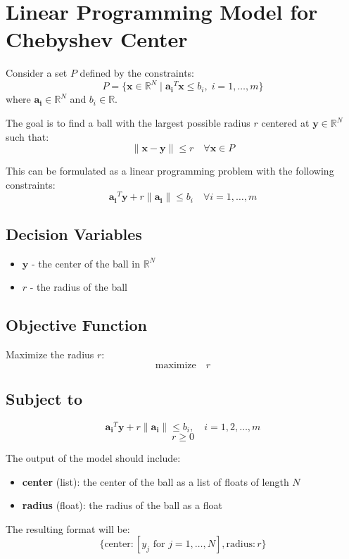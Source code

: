 \documentclass{article}
\begin{document}
\section*{Linear Programming Model for Chebyshev Center}

Consider a set \( P \) defined by the constraints:
\[
P = \{ \mathbf{x} \in \mathbb{R}^N \mid \mathbf{a_i}^T \mathbf{x} \leq b_i, \; i = 1, \ldots, m \}
\]
where \( \mathbf{a_i} \in \mathbb{R}^N \) and \( b_i \in \mathbb{R} \).

The goal is to find a ball with the largest possible radius \( r \) centered at \( \mathbf{y} \in \mathbb{R}^N \) such that:
\[
\|\mathbf{x} - \mathbf{y}\| \leq r \quad \forall \mathbf{x} \in P
\]

This can be formulated as a linear programming problem with the following constraints:
\[
\mathbf{a_i}^T \mathbf{y} + r \|\mathbf{a_i}\| \leq b_i \quad \forall i = 1, \ldots, m
\]

\subsection*{Decision Variables}
\begin{itemize}
    \item \( \mathbf{y} \) - the center of the ball in \( \mathbb{R}^N \)
    \item \( r \) - the radius of the ball
\end{itemize}

\subsection*{Objective Function}
Maximize the radius \( r \):
\[
\text{maximize} \quad r
\]

\subsection*{Subject to}
\[
\mathbf{a_i}^T \mathbf{y} + r \|\mathbf{a_i}\| \leq b_i, \quad i = 1, 2, \ldots, m
\]
\[
r \geq 0
\]

The output of the model should include:
\begin{itemize}
    \item \textbf{center} (list): the center of the ball as a list of floats of length \( N \)
    \item \textbf{radius} (float): the radius of the ball as a float
\end{itemize}

The resulting format will be:
\[
\{ 
    \text{center}: [y_j \text{ for } j = 1, \ldots, N], 
    \text{radius}: r 
\}
\]
\end{document}
